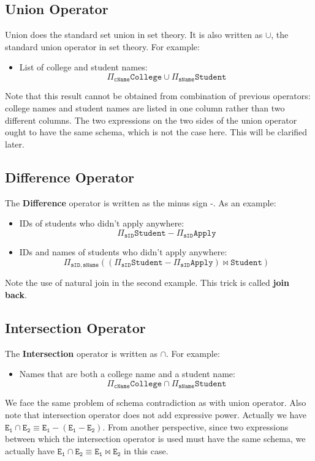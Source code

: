 \subsection{Union Operator}
Union does the standard set union in set theory. It is also written as $\cup$, the standard union operator in set theory. For example:
\begin{itemize}
\item List of college and student names:
\begin{equation*}
\mathtt{\Pi_{cName}College\cup\Pi_{sName}Student}
\end{equation*}
\end{itemize}
Note that this result cannot be obtained from combination of previous operators: college names and student names are listed in one column rather than two different columns. The two expressions on the two sides of the union operator ought to have the same schema, which is not the case here. This will be clarified later.  
\subsection{Difference Operator}
The \textbf{Difference} operator is written as the minus sign -. As an example:
\begin{itemize}
\item IDs of students who didn't apply anywhere:
\begin{equation*}
\mathtt{\Pi_{sID}Student-\Pi_{sID}Apply}
\end{equation*}
\item IDs and names of students who didn't apply anywhere:
\begin{equation*}
\mathtt{\Pi_{sID,sName}\left(\left(\Pi_{sID}Student-\Pi_{sID}Apply\right)\bowtie Student\right)}
\end{equation*}
\end{itemize}
Note the use of natural join in the second example. This trick is called \textbf{join back}.
\subsection{Intersection Operator}
The \textbf{Intersection} operator is written as $\cap$. For example:
\begin{itemize}
\item Names that are both a college name and a student name:
\begin{equation*}
\mathtt{\Pi_{cName}College\cap\Pi_{sName}Student}
\end{equation*}
\end{itemize}
We face the same problem of schema contradiction as with union operator. Also note that intersection operator does not add expressive power. Actually we have $\mathtt{E_1\cap E_2 \equiv E_1-(E_1-E_2)}$. From another perspective, since two expressions between which the intersection operator is used must have the same schema, we actually have $\mathtt{E_1\cap E_2\equiv E_1\bowtie E_2}$ in this case.

